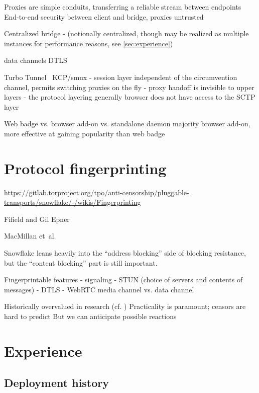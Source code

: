 \documentclass[letterpaper,twocolumn]{article}
\begin{document}

Proxies are simple conduits, transferring a reliable stream between endpoints
End-to-end security between client and bridge, proxies untrusted

Centralized bridge
- (notionally centralized, though may be realized as multiple instances for performance reasons, see \autoref{sec:experience})

data channels
DTLS
\cite[\S 1]{rfc8831}

Turbo Tunnel~\cite{Fifield2020a}
KCP/smux
- session layer independent of the circumvention channel, permits switching proxies on the fly
- proxy handoff is invisible to upper layers
- the protocol layering generally
browser does not have access to the SCTP layer

Web badge vs. browser add-on vs. standalone daemon
majority browser add-on, more effective at gaining popularity than web badge

\section{Protocol fingerprinting}
\label{sec:fingerprinting}


\url{https://gitlab.torproject.org/tpo/anti-censorship/pluggable-transports/snowflake/-/wikis/Fingerprinting}

Fifield and Gil Epner~\cite{arxiv.1605.08805}

MacMillan et~al.~\cite{arxiv.2008.03254}

Snowflake leans heavily into the ``address blocking'' side of blocking
resistance, but the ``content blocking'' part is still important.

Fingerprintable features
- signaling
- STUN (choice of servers and contents of messages)
- DTLS
- WebRTC media channel vs. data channel

Historically overvalued in research (cf. \cite{Tschantz2016a})
Practicality is paramount; censors are hard to predict
But we can anticipate possible reactions

\section{Experience}
\label{sec:experience}

\subsection{Deployment history}
\end{document}
